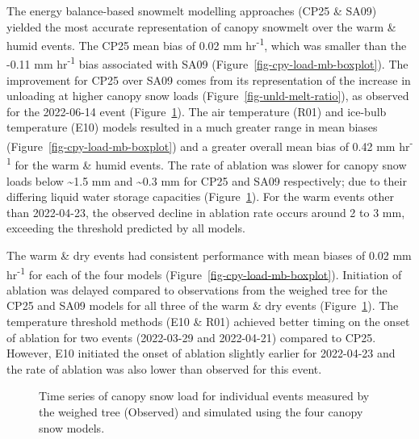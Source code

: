 \documentclass[
]{agujournal2019}
\begin{document}
The energy balance-based snowmelt modelling approaches (CP25 \& SA09)
yielded the most accurate representation of canopy snowmelt over the
warm \& humid events. The CP25 mean bias of 0.02 mm
hr\textsuperscript{-1}, which was smaller than the -0.11 mm
hr\textsuperscript{-1} bias associated with SA09
(Figure~\ref{fig-cpy-load-mb-boxplot}). The improvement for CP25 over
SA09 comes from its representation of the increase in unloading at
higher canopy snow loads (Figure~\ref{fig-unld-melt-ratio}), as observed
for the 2022-06-14 event (Figure~\ref{fig-obs-mod-w-tree}). The air
temperature (R01) and ice-bulb temperature (E10) models resulted in a
much greater range in mean biases (Figure~\ref{fig-cpy-load-mb-boxplot})
and a greater overall mean bias of 0.42 mm hr\textsuperscript{-1} for
the warm \& humid events. The rate of ablation was slower for canopy
snow loads below \textasciitilde1.5 mm and \textasciitilde0.3 mm for
CP25 and SA09 respectively; due to their differing liquid water storage
capacities (Figure~\ref{fig-obs-mod-w-tree}). For the warm events other
than 2022-04-23, the observed decline in ablation rate occurs around 2
to 3 mm, exceeding the threshold predicted by all models.

The warm \& dry events had consistent performance with mean biases of
0.02 mm hr\textsuperscript{-1} for each of the four models
(Figure~\ref{fig-cpy-load-mb-boxplot}). Initiation of ablation was
delayed compared to observations from the weighed tree for the CP25 and
SA09 models for all three of the warm \& dry events
(Figure~\ref{fig-obs-mod-w-tree}). The temperature threshold methods
(E10 \& R01) achieved better timing on the onset of ablation for two
events (2022-03-29 and 2022-04-21) compared to CP25. However, E10
initiated the onset of ablation slightly earlier for 2022-04-23 and the
rate of ablation was also lower than observed for this event.

\begin{figure}[htbp]


\caption{\label{fig-obs-mod-w-tree}Time series of canopy snow load for
individual events measured by the weighed tree (Observed) and simulated
using the four canopy snow models.}

\end{figure}%
\end{document}
